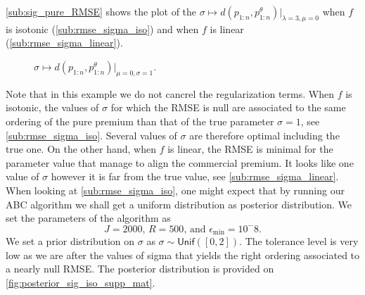 \documentclass[10pt]{article}
\newcommand*{\UnifDist}{\mathsf{Unif}}
\begin{document}
\cref{sub:sig_pure_RMSE} shows the plot of the $\sigma\mapsto d\left(p_{1:n},p_{1:n}^{\theta}\right)\Big\rvert_{\lambda =3, \mu =0}$ when $f$ is isotonic (\cref{sub:rmse_sigma_iso}) and when $f$ is linear (\cref{sub:rmse_sigma_linear}).

\begin{figure}[!ht]
  \begin{center}
    \caption{$\sigma\mapsto d\left(p_{1:n},p_{1:n}^{\theta}\right)\Big\rvert_{\mu =0, \sigma = 1}$.}
    \label{fig:rmse_sigma_iso_linear}
  \end{center}
\end{figure}

Note that in this example we do not cancrel the regularization terms. When $f$ is isotonic, the values of $\sigma$ for which the RMSE is null are associated to the same ordering of the pure premium than that of the true parameter $\sigma=1$, see \cref{sub:rmse_sigma_iso}. Several values of $\sigma$ are therefore optimal including the true one. On the other hand, when $f$ is linear, the RMSE is minimal for the parameter value that manage to align the commercial premium. It looks like one value of $\sigma$ however it is far from the true value, see \cref{sub:rmse_sigma_linear}. When looking at \cref{sub:rmse_sigma_iso}, one might expect that by running our ABC algorithm we shall get a uniform distribution as posterior distribution. We set the parameters of the algorithm as 
$$
J = 2000\text{, }R= 500\text{, and }\epsilon_{\min} =10^-8.
$$
We set a prior distribution on $\sigma$ as $\sigma\sim\UnifDist([0, 2])$. The tolerance level is very low as we are after the values of sigma that yields the right ordering associated to a nearly null RMSE. The posterior distribution is provided on \cref{fig:posterior_sig_iso_supp_mat}.
\end{document}
